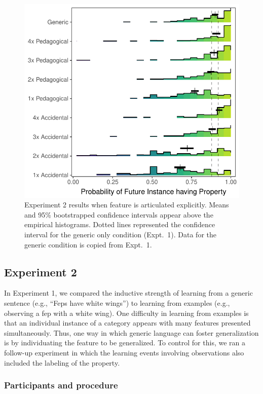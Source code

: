 \documentclass[10pt,letterpaper]{article}
\begin{document}
\begin{figure}[t]
\begin{center}
 \includegraphics[width=\linewidth]{figs/genex-expt2_9conditions_reordered.pdf}
\end{center}
\caption{Experiment 2 results when feature is articulated explicitly. Means and 95\% bootstrapped confidence intervals appear above the empirical histograms. Dotted lines represented the confidence interval for the generic only condition (Expt.~1). Data for the generic condition is copied from Expt.~1.}
\label{fig:results2}
\end{figure}
\subsection{Experiment 2}

In Experiment 1, we compared the inductive strength of learning from a generic sentence (e.g., ``Feps have white wings'') to learning from examples (e.g., observing a fep with a white wing). 
One difficulty in learning from examples is that an individual instance of a category appears with many features presented simultaneously. 
Thus, one way in which generic language can foster generalization is by individuating the feature to be generalized. 
To control for this, we ran a follow-up experiment in which the learning events involving observations also included the labeling of the property.

\subsubsection{Participants and procedure}
\end{document}
